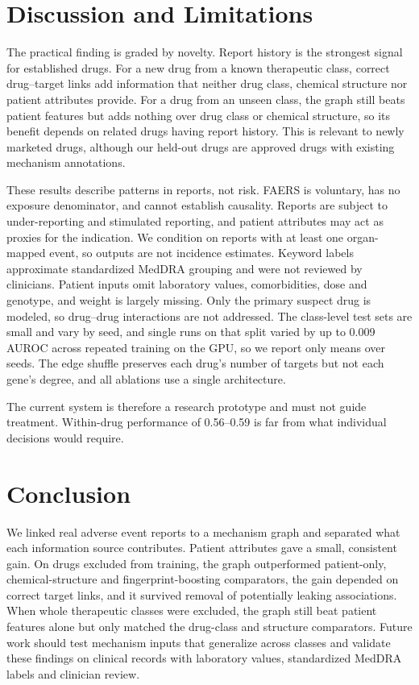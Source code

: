 \documentclass[conference,letterpaper]{IEEEtran}
\begin{document}
\section{Discussion and Limitations}
The practical finding is graded by novelty. Report history is the strongest signal for established drugs. For a new drug from a known therapeutic class, correct drug--target links add information that neither drug class, chemical structure nor patient attributes provide. For a drug from an unseen class, the graph still beats patient features but adds nothing over drug class or chemical structure, so its benefit depends on related drugs having report history. This is relevant to newly marketed drugs, although our held-out drugs are approved drugs with existing mechanism annotations.

These results describe patterns in reports, not risk. FAERS is voluntary, has no exposure denominator, and cannot establish causality. Reports are subject to under-reporting and stimulated reporting, and patient attributes may act as proxies for the indication. We condition on reports with at least one organ-mapped event, so outputs are not incidence estimates. Keyword labels approximate standardized MedDRA grouping and were not reviewed by clinicians. Patient inputs omit laboratory values, comorbidities, dose and genotype, and weight is largely missing. Only the primary suspect drug is modeled, so drug--drug interactions are not addressed. The class-level test sets are small and vary by seed, and single runs on that split varied by up to 0.009 AUROC across repeated training on the GPU, so we report only means over seeds. The edge shuffle preserves each drug's number of targets but not each gene's degree, and all ablations use a single architecture.

The current system is therefore a research prototype and must not guide treatment. Within-drug performance of 0.56--0.59 is far from what individual decisions would require.

\section{Conclusion}
We linked real adverse event reports to a mechanism graph and separated what each information source contributes. Patient attributes gave a small, consistent gain. On drugs excluded from training, the graph outperformed patient-only, chemical-structure and fingerprint-boosting comparators, the gain depended on correct target links, and it survived removal of potentially leaking associations. When whole therapeutic classes were excluded, the graph still beat patient features alone but only matched the drug-class and structure comparators. Future work should test mechanism inputs that generalize across classes and validate these findings on clinical records with laboratory values, standardized MedDRA labels and clinician review.
\end{document}
